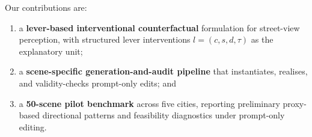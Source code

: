 Our contributions are:
\begin{enumerate}
    \item a \textbf{lever-based interventional counterfactual} formulation for street-view perception, with structured lever interventions $l=(c,s,d,\tau)$ as the explanatory unit;
    \item a \textbf{scene-specific generation-and-audit pipeline} that instantiates, realises, and validity-checks prompt-only edits; and
    \item a \textbf{50-scene pilot benchmark} across five cities, reporting preliminary proxy-based directional patterns and feasibility diagnostics under prompt-only editing.
\end{enumerate}